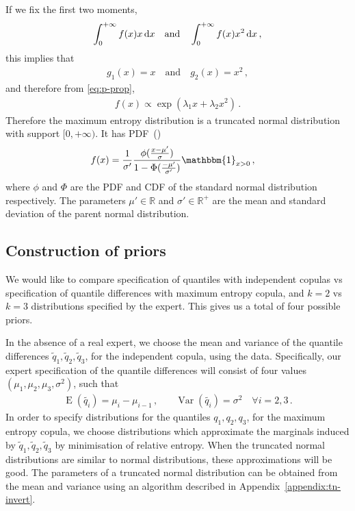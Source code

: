\documentclass{article}
\DeclareMathOperator{\E}{E}
\DeclareMathOperator{\Var}{Var}
\newcommand{\R}{\mathbb{R}}
\newcommand{\dd}{{\rm d}}
\begin{document}
If we fix the first two moments,
%
\begin{align*}
	\int_{0}^{+\infty} f(x) x \, \dd x \quad \text{and} \quad
		\int_{0}^{+\infty} f(x) x ^ 2 \, \dd x \,,
\end{align*}
%
this implies that
%
\begin{align*}
	g_1(x) = x \quad \text{and} \quad
		g_2(x) = x ^ 2 \,,
\end{align*}
%
and therefore from \eqref{eq:p-prop},
%
\begin{align*}
	f(x) \propto \exp\left(\lambda_1 x + \lambda_2 x ^ 2\right) \,.
\end{align*}
%
Therefore the maximum entropy distribution is a truncated normal distribution
with support $[0, +\infty)$. It has PDF~(\cite{johnson})
%
\begin{align*}
	f(x) &= \frac{1}{\sigma'} \frac{\phi(\frac{x - \mu'}{\sigma})}
		{1 - \Phi(\frac{-\mu'}{\sigma'})}
		\mathbbm{1}_{x > 0} \,,
\end{align*}
%
where $\phi$ and $\Phi$ are the PDF and CDF of the
standard normal distribution respectively.
The parameters $\mu' \in \R$ and $\sigma' \in \R^+$
are the mean and standard deviation of the
parent normal distribution.
%
\subsection{Construction of priors}
%
We would like to compare 
specification of quantiles with independent copulas vs
specification of quantile differences with maximum entropy copula,
and $k = 2$ vs $k = 3$ distributions specified by the expert.
This gives us a total of four possible priors.
%

%
In the absence of a real expert, we choose the mean and variance
of the quantile differences $\tilde{q}_1, \tilde{q}_2, \tilde{q}_3$,
for the independent copula, using the data.
Specifically, our expert specification
of the quantile differences will consist of
four values $(\mu_1, \mu_2, \mu_3, \sigma ^ 2)$, such that
%
\begin{align*}
	\E(\tilde{q_i}) = \mu_i - \mu_{i - 1} \,,
		&\quad \Var(\tilde{q_i}) = \sigma ^ 2 \quad \forall i = 2, 3 \,.
\end{align*}
%
In order to specify distributions for the quantiles $q_1, q_2, q_3$,
for the maximum entropy copula,
we choose distributions which approximate the marginals induced
by $\tilde{q}_1, \tilde{q}_2, \tilde{q}_3$
by minimisation of relative entropy.
When the truncated normal distributions are similar to normal distributions,
these approximations will be good.
The parameters of a truncated normal distribution can be obtained
from the mean and variance using an algorithm described in Appendix~\ref{appendix:tn-invert}.
%
\end{document}
